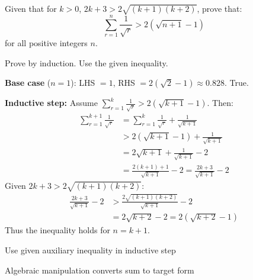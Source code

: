 \begin{problem}
Given that for $k > 0$, $2k + 3 > 2\sqrt{(k+1)(k+2)}$, prove that:
\[ \sum_{r=1}^{n} \frac{1}{\sqrt{r}} > 2\left(\sqrt{n+1} - 1\right) \]
for all positive integers $n$.
\end{problem}

\begin{hint}
Prove by induction. Use the given inequality.
\end{hint}

\begin{solution}
\textbf{Base case} ($n=1$): LHS $= 1$, RHS $= 2(\sqrt{2}-1) \approx 0.828$. True.

\textbf{Inductive step:} Assume $\sum_{r=1}^{k} \frac{1}{\sqrt{r}} > 2(\sqrt{k+1} - 1)$.
Then:
\begin{align*}
\sum_{r=1}^{k+1} \frac{1}{\sqrt{r}} &= \sum_{r=1}^{k} \frac{1}{\sqrt{r}} + \frac{1}{\sqrt{k+1}}\\
&> 2(\sqrt{k+1} - 1) + \frac{1}{\sqrt{k+1}}\\
&= 2\sqrt{k+1} + \frac{1}{\sqrt{k+1}} - 2\\
&= \frac{2(k+1) + 1}{\sqrt{k+1}} - 2 = \frac{2k+3}{\sqrt{k+1}} - 2
\end{align*}
Given $2k+3 > 2\sqrt{(k+1)(k+2)}$:
\begin{align*}
\frac{2k+3}{\sqrt{k+1}} - 2 &> \frac{2\sqrt{(k+1)(k+2)}}{\sqrt{k+1}} - 2\\
&= 2\sqrt{k+2} - 2 = 2(\sqrt{k+2} - 1)
\end{align*}
Thus the inequality holds for $n = k+1$.
\end{solution}

\begin{takeaways}
\item Use given auxiliary inequality in inductive step
\item Algebraic manipulation converts sum to target form
\end{takeaways}
